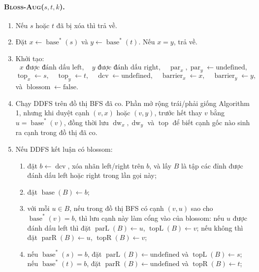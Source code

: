 \documentclass[11pt]{article}
\begin{document}
\paragraph{\textsc{Bloss-Aug}(\(s,t,k\)).}
\begin{enumerate}
  \item Nếu \(s\) hoặc \(t\) đã bị xóa thì trả về.
  \item Đặt \(x\leftarrow\operatorname{base}^*(s)\) và
  \(y\leftarrow\operatorname{base}^*(t)\). Nếu \(x=y\), trả về.
  \item Khởi tạo:
  \[
    x\text{ được đánh dấu left},\quad y\text{ được đánh dấu right},\quad
    \operatorname{par}_x,\operatorname{par}_y\leftarrow\mathrm{undefined},
  \]
  \[
    \operatorname{top}_x\leftarrow s,\quad \operatorname{top}_y\leftarrow t,
    \quad
    \operatorname{dcv}\leftarrow\mathrm{undefined},\quad
    \operatorname{barrier}_x\leftarrow x,\quad
    \operatorname{barrier}_y\leftarrow y,
  \]
  và \(\operatorname{blossom}\leftarrow\mathrm{false}\).
  \item Chạy DDFS trên đồ thị BFS đã co. Phần mở rộng trái/phải giống
  Algorithm 1, nhưng khi duyệt cạnh \((v,x)\) hoặc \((v,y)\), trước hết thay
  \(v\) bằng \(u=\operatorname{base}^*(v)\), đồng thời lưu
  \(\operatorname{dw}_x,\operatorname{dw}_y\) và \(\operatorname{top}\) để biết
  cạnh gốc nào sinh ra cạnh trong đồ thị đã co.
  \item Nếu DDFS kết luận có blossom:
  \begin{enumerate}
    \item đặt \(b\leftarrow\operatorname{dcv}\), xóa nhãn left/right trên \(b\),
    và lấy \(B\) là tập các đỉnh được đánh dấu left hoặc right trong lần gọi này;
    \item đặt \(\operatorname{base}(B)\leftarrow b\);
    \item với mỗi \(u\in B\), nếu trong đồ thị BFS có cạnh \((v,u)\) sao cho
    \(\operatorname{base}^*(v)=b\), thì lưu cạnh này làm cổng vào của blossom:
    nếu \(u\) được đánh dấu left thì đặt
    \(\operatorname{parL}(B)\leftarrow u\), \(\operatorname{topL}(B)\leftarrow v\);
    nếu không thì đặt
    \(\operatorname{parR}(B)\leftarrow u\), \(\operatorname{topR}(B)\leftarrow v\);
    \item nếu \(\operatorname{base}^*(s)=b\), đặt
    \(\operatorname{parL}(B)\leftarrow\mathrm{undefined}\) và
    \(\operatorname{topL}(B)\leftarrow s\); nếu \(\operatorname{base}^*(t)=b\),
    đặt \(\operatorname{parR}(B)\leftarrow\mathrm{undefined}\) và
    \(\operatorname{topR}(B)\leftarrow t\);

\end{enumerate}
\end{enumerate}
\end{document}
